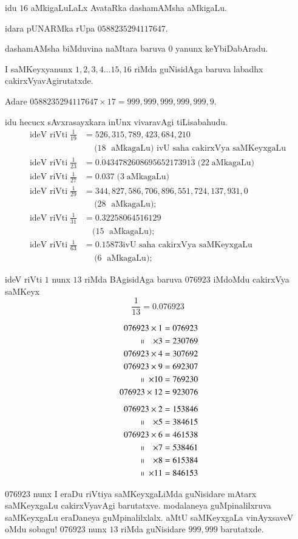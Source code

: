 idu $16$ aMkigaLuLaLx AvataRka dashamAMsha aMkigaLu.

idara pUNARMka rUpa $0588235294117647$.

dashamAMsha biMduvina naMtara baruva $0$ yanunx keYbiDabAradu.

I saMKeyxyanunx $1,2,3,4\ldots 15,16$ riMda guNisidAga baruva labadhx cakirxVyavAgirutatxde.

Adare $0588235294117647\times 17=999,999,999,999,999,9$.

idu hecucx sAvxrasayxkara inUnx vivaravAgi tiLisabahudu.
\begin{align*}
\text{ideV riVti} \;\frac{1}{19} &=  526, 315, 789, 423, 684, 210\\
&\quad ~(18\; \text{ aMkagaLu)  ivU saha cakirxVya saMKeyxgaLu}\\[0.1cm]
\text{ideV riVti}\; \frac{1}{23} &=  0.{\dot 0}43478260869565217391{\dot 3}\; (22 \;\text{aMkagaLu)}\\
\text{ideV riVti} \;\frac{1}{27} &=  0.037 \;(3 \;\text{aMkagaLu)}\\
\text{ideV riVti} \;\frac{1}{29} &=  344,827,586,706,896,551,724,137,931,0\\
&\quad ~(28\; \text{ aMkagaLu)};\\
\text{ideV riVti} \;\frac{1}{31} &=  0.32258064516129\\
&\quad(15\; \text{ aMkagaLu)};\\
\text{ideV riVti}\;\frac{1}{63} &=   0.15873 \text{ivU saha cakirxVya saMKeyxgaLu}\\
 &\quad ~(6\; \text{ aMkagaLu)};
\end{align*}

ideV riVti $1$ nunx $13$ riMda BAgisidAga baruva $076923$ iMdoMdu cakirxVya saMKeyx
$$
\frac{1}{13} = 0.076923
$$
\newpage

\begin{align*}
076923 \times 1 &= 076923 \\
~~~~~~~~~\shortparallel ~~~\times 3 &= 230769 \\ 
076923\times 4 &= 307692 \\
076923\times 9 &= 692307 \\ 
~~~~~~~~~~~\shortparallel ~\times 10 &= 769230 \\
076923\times 12 &= 923076\\[5pt] 
076923 \times 2 &= 153846 \\
~~~~~~~~~\shortparallel ~~~\times 5 &= 384615 \\
076923   \times 6 &= 461538 \\
~~~~~~~~~\shortparallel ~~~\times 7 &= 538461 \\
~~~~~~~~~\shortparallel ~~~\times 8 &= 615384 \\
~~~~~~~~~~~\shortparallel ~\times 11 &= 846153 
\end{align*}

$076923$ nunx  I eraDu riVtiya saMKeyxgaLiMda guNisidare mAtarx saMKeyxgaLu cakirxVyavAgi barutatxve. modalaneya guMpinalilxruva saMKeyxgaLu eraDaneya guMpinalilxlalx. aMtU saMKeyxgaLa vinAyxsaveV oMdu sobagu! $076923$ nunx $13$ riMda guNisidare $999,999$ barutatxde.
